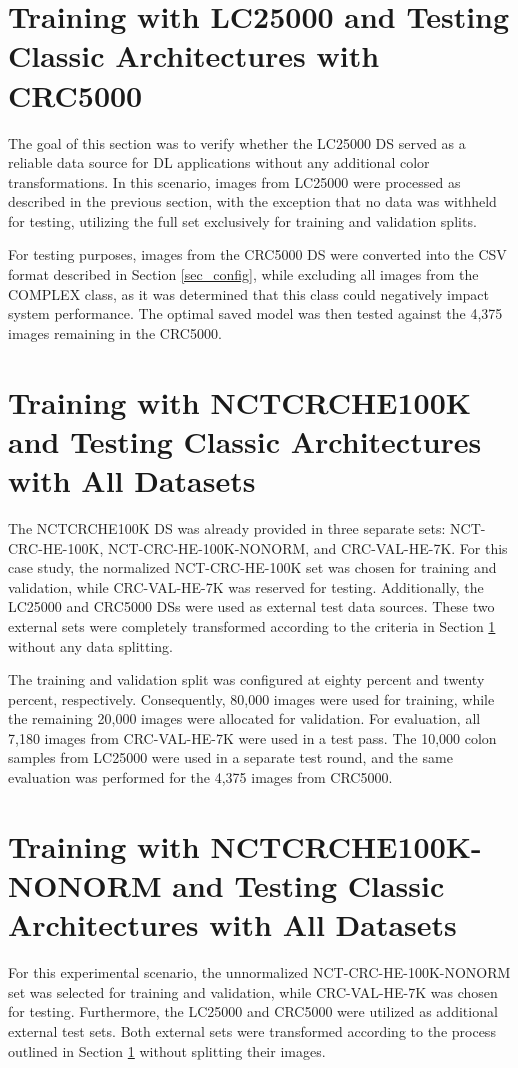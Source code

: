 \section{Training with LC25000 and Testing Classic Architectures with CRC5000}
\label{sec_second_attempt}
The goal of this section was to verify whether the \gls{LC25000} \gls{DS} served as a reliable data source for \gls{DL} applications without any additional color transformations. In this scenario, images from \gls{LC25000} were processed as described in the previous section, with the exception that no data was withheld for testing, utilizing the full set exclusively for training and validation splits.

For testing purposes, images from the \gls{CRC5000} \gls{DS} were converted into the CSV format described in Section \ref{sec_config}, while excluding all images from the COMPLEX class, as it was determined that this class could negatively impact system performance. The optimal saved model was then tested against the 4,375 images remaining in the \gls{CRC5000}.

\section{Training with NCTCRCHE100K and Testing Classic Architectures with All Datasets}
\label{sec_third_attempt}
The \gls{NCTCRCHE100K} \gls{DS} was already provided in three separate sets: NCT-CRC-HE-100K, NCT-CRC-HE-100K-NONORM, and CRC-VAL-HE-7K. For this case study, the normalized NCT-CRC-HE-100K set was chosen for training and validation, while CRC-VAL-HE-7K was reserved for testing. Additionally, the \gls{LC25000} and \gls{CRC5000} \glspl{DS} were used as external test data sources. These two external sets were completely transformed according to the criteria in Section \ref{sec_second_attempt} without any data splitting.

The training and validation split was configured at eighty percent and twenty percent, respectively. Consequently, 80,000 images were used for training, while the remaining 20,000 images were allocated for validation. For evaluation, all 7,180 images from CRC-VAL-HE-7K were used in a test pass. The 10,000 colon samples from \gls{LC25000} were used in a separate test round, and the same evaluation was performed for the 4,375 images from \gls{CRC5000}.

\section{Training with NCTCRCHE100K-NONORM and Testing Classic Architectures with All Datasets}
\label{sec_fourth_attempt}
For this experimental scenario, the unnormalized NCT-CRC-HE-100K-NONORM set was selected for training and validation, while CRC-VAL-HE-7K was chosen for testing. Furthermore, the \gls{LC25000} and \gls{CRC5000} were utilized as additional external test sets. Both external sets were transformed according to the process outlined in Section \ref{sec_second_attempt} without splitting their images.

